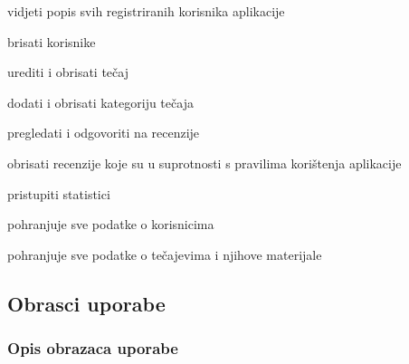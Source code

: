\begin{packed_enum}
\begin{packed_enum}
				\end{packed_enum}
			
				\item  {}
				
				\begin{packed_enum}
					
					\item vidjeti popis svih registriranih korisnika aplikacije
					\item brisati korisnike
					\item urediti i obrisati tečaj
					\item dodati i obrisati kategoriju tečaja
					\item pregledati i odgovoriti na recenzije
					\item obrisati recenzije koje su u suprotnosti s pravilima korištenja aplikacije
					\item pristupiti statistici
					
				\end{packed_enum}
			
				\item  {}
				
				\begin{packed_enum}
					
					\item pohranjuje sve podatke o korisnicima
					\item pohranjuje sve podatke o tečajevima i njihove materijale
					
				\end{packed_enum}
			\end{packed_enum}
			
			\eject 
			
			
				
			\subsection{Obrasci uporabe}
				
				
				\subsubsection{Opis obrazaca uporabe}

